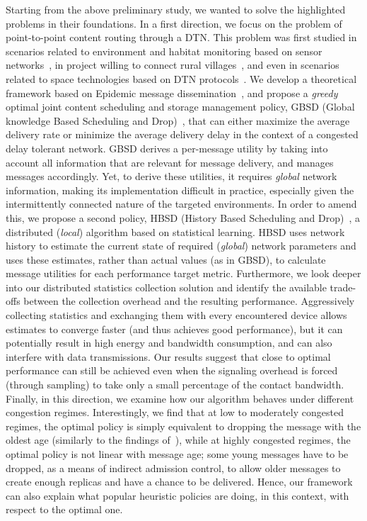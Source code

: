 Starting from the above preliminary study, we wanted to solve the highlighted problems in their foundations. In a first direction, we focus on the problem of point-to-point content routing through a DTN. This problem was first studied in scenarios related to environment and habitat monitoring based on sensor networks~\cite{MOMO, ARNETMINER}, in project willing to connect rural villages~\cite{ResiliNets, UMassDieselNet, KIOSKNET, BYTEWALLA, TIER}, and even in scenarios related to space technologies based on DTN protocols~\cite{BioServe, Saratoga}. We develop a theoretical framework based on Epidemic message dissemination~\cite{haas:mobihoc03,Inria:MessageDelay,akis:mobihoc06}, and propose a \emph{greedy} optimal joint content scheduling and storage management policy, GBSD (Global knowledge Based Scheduling and Drop)~\cite{KrifaBS08, HBSDDTN2}, that can either maximize the average delivery rate or minimize the average delivery delay in the context of a congested delay tolerant network. GBSD derives a per-message utility by taking into account all information that are relevant for message delivery, and manages messages accordingly. Yet, to derive these utilities, it requires \textit{global} network information, making its implementation difficult in practice, especially given the intermittently connected nature of the targeted environments. In order to amend this, we propose a second policy, HBSD (History Based Scheduling and Drop)~\cite{KrifaBS08, HBSDDTN2}, a distributed (\textit{local}) algorithm based on statistical learning. HBSD uses network history to estimate the current state of required (\textit{global}) network parameters and uses these estimates, rather than actual values (as in GBSD), to calculate message utilities for each performance target metric. Furthermore, we look deeper into our distributed statistics collection solution and identify the available trade-offs between the collection overhead and the resulting performance. Aggressively collecting statistics and exchanging them with every encountered device allows estimates to converge faster (and thus achieves good performance), but it can potentially result in high energy and bandwidth consumption, and can also interfere with data transmissions. Our results suggest that close to optimal performance can still be achieved even when the signaling overhead is forced (through sampling) to take only a small percentage of the contact bandwidth. Finally, in this direction, we examine how our algorithm behaves under different congestion regimes. Interestingly, we find that at low to moderately congested regimes, the optimal policy is simply equivalent to dropping the message with the oldest age (similarly to the findings of~\cite{QueuingPolicies}), while at highly congested regimes, the optimal policy is not linear with message age; some young messages have to be dropped, as a means of indirect admission control, to allow older messages to create enough replicas and have a chance to be delivered. Hence, our framework can also explain what popular heuristic policies are doing, in this context, with respect to the optimal one.

